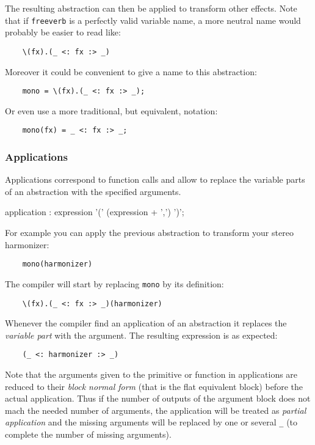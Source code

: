 The resulting abstraction can then be applied to transform other effects. Note that if \lstinline'freeverb' is a perfectly valid variable name, a more neutral name would probably be easier to read like:
\begin{lstlisting}
	\(fx).(_ <: fx :> _)
\end{lstlisting}
 
Moreover it could be convenient to give a name to this abstraction:
\begin{lstlisting}
	mono = \(fx).(_ <: fx :> _);
\end{lstlisting}

Or even use a more traditional, but equivalent, notation:
\begin{lstlisting}
	mono(fx) = _ <: fx :> _;
\end{lstlisting}

\subsubsection{Applications}
Applications correspond to function calls and allow to replace the variable parts of an abstraction with the specified arguments.

\begin{rail}
application : expression '(' (expression + ',') ')';
\end{rail}   

For example you can apply the previous abstraction to transform your stereo harmonizer:
\begin{lstlisting}
	mono(harmonizer)
\end{lstlisting}

The compiler will start by replacing \lstinline'mono' by its definition:
\begin{lstlisting}
	\(fx).(_ <: fx :> _)(harmonizer)
\end{lstlisting}

Whenever the \faust compiler find an application of an abstraction it replaces the \emph{variable part} with the argument. The resulting expression is as expected:
\begin{lstlisting}
	(_ <: harmonizer :> _)
\end{lstlisting}

Note that the arguments given to the primitive or function in applications are reduced to their \emph{block normal form} (that is the flat equivalent block) before the actual application. Thus if the number of outputs of the argument block does not mach the needed number of arguments, the application will be treated as \emph{partial application} and the missing arguments will be replaced by one or several \lstinline'_' (to complete the number of missing arguments). 

